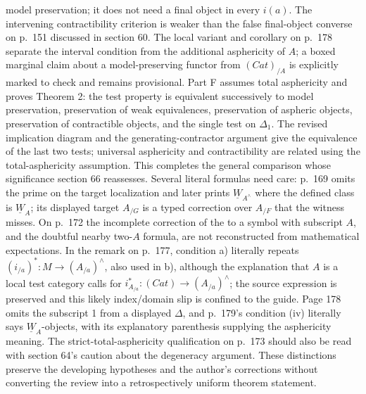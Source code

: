 \documentclass[10pt,oneside]{book}
\begin{document}
model preservation; it does not need a final object in every $i(a)$. The intervening contractibility criterion is weaker than the false final-object converse on p.~151 discussed in section 60. The local variant and corollary on p.~178 separate the interval condition from the additional asphericity of $A$; a boxed marginal claim about a model-preserving functor from $(Cat)_{/A}$ is explicitly marked to check and remains provisional. Part F assumes total asphericity and proves Theorem 2: the test property is equivalent successively to model preservation, preservation of weak equivalences, preservation of aspheric objects, preservation of contractible objects, and the single test on $\Delta_1$. The revised implication diagram and the generating-contractor argument give the equivalence of the last two tests; universal asphericity and contractibility are related using the total-asphericity assumption. This completes the general comparison whose significance section 66 reassesses. Several literal formulas need care: p.~169 omits the prime on the target localization and later prints $\underline W_{A^\wedge}$ where the defined class is $\underline W_A$; its displayed target $A_{/G}$ is a typed correction over $A_{/F}$ that the witness misses. On p.~172 the incomplete correction of the to a symbol with subscript $A$, and the doubtful nearby two-$A$ formula, are not reconstructed from mathematical expectations. In the remark on p.~177, condition a) literally repeats $(i_{/a})^*:M\to(A_{/a})^\wedge$, also used in b), although the explanation that $A$ is a local test category calls for $i_{A_{/a}}^*:(Cat)\to(A_{/a})^\wedge$; the source expression is preserved and this likely index/domain slip is confined to the guide. Page 178 omits the subscript 1 from a displayed $\Delta$, and p.~179's condition (iv) literally says $\underline W_A$-objects, with its explanatory parenthesis supplying the asphericity meaning. The strict-total-asphericity qualification on p.~173 should also be read with section 64's caution about the degeneracy argument. These distinctions preserve the developing hypotheses and the author's corrections without converting the review into a retrospectively uniform theorem statement.
\end{document}
